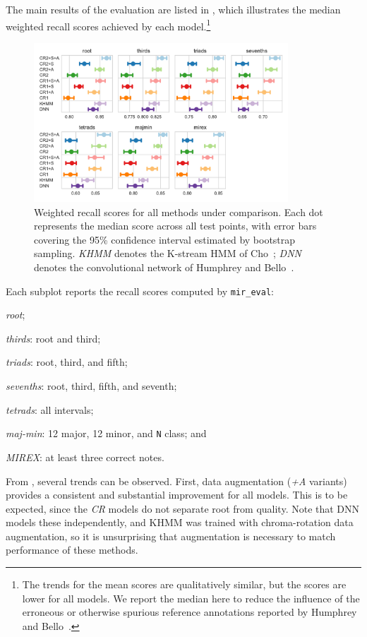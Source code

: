 \documentclass{article}
\begin{document}
The main results of the evaluation are listed in , which illustrates the median weighted recall scores achieved by each model.\footnote{The trends for the mean scores are qualitatively similar, but the scores are lower for all models. We report the median here to reduce the influence of the erroneous or otherwise spurious reference annotations reported by Humphrey and Bello~\cite{humphrey2015four}.}
\begin{figure}[t]
    \centering
    \includegraphics[width=0.85\textwidth]{crnn-scores}
    \caption{Weighted recall scores for all methods under comparison.  Each dot represents the median score across all test points, with error bars covering the 95\% confidence interval estimated by bootstrap sampling.
        \emph{KHMM} denotes the K-stream HMM of Cho~\cite{cho2014improved}; \emph{DNN} denotes the convolutional network of Humphrey and Bello~\cite{humphrey2015four}.\label{fig:results}}
\end{figure}
Each subplot reports the recall scores computed by \texttt{mir\_eval}:
\begin{enumerate*}
    \item \emph{root};
    \item \emph{thirds}: root and third;
    \item \emph{triads}: root, third, and fifth;
    \item \emph{sevenths}: root, third, fifth, and seventh;
    \item \emph{tetrads}: all intervals;
    \item \emph{maj-min}: 12 major, 12 minor, and \texttt{N} class; and
    \item \emph{MIREX}: at least three correct notes.
\end{enumerate*}

From , several trends can be observed.
First, data augmentation (\emph{+A} variants) provides a consistent and substantial improvement for all models.
This is to be expected, since the \emph{CR} models do not separate root from quality.
Note that DNN models these independently, and KHMM was trained with chroma-rotation data augmentation, so it is unsurprising that augmentation is necessary to match performance of these methods.
\end{document}
